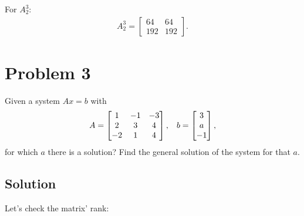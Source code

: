 \documentclass[letterpaper,10pt,english]{jupyterBook}
\begin{document}
\sphinxAtStartPar
For \(A_2^3\):
\begin{equation*}
\begin{split}
A_2^3 = 
\begin{bmatrix}
64 & 64\\
192 & 192
\end{bmatrix}
.
\end{split}
\end{equation*}

\section{Problem 3}
\label{\detokenize{notebooks/ProblemSet2:problem-3}}
\sphinxAtStartPar
Given a system \(Ax = b\) with
\begin{equation*}
\begin{split}
A = 
\begin{bmatrix}
  1 & -1 & -3\\
  2 & 3 & 4\\
  -2 & 1 & 4\\
\end{bmatrix}
,\hspace{3mm}
b = 
\begin{bmatrix}
  3\\
  a\\
  -1\\
\end{bmatrix}
,
\end{split}
\end{equation*}
\sphinxAtStartPar
for which \(a\) there is a solution? Find the general solution of the system for that \(a\).


\subsection{Solution}
\label{\detokenize{notebooks/ProblemSet2:id2}}
\sphinxAtStartPar
Let’s check the matrix’ rank:
\end{document}

